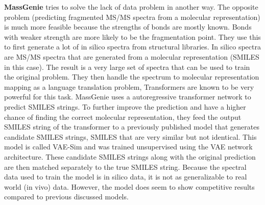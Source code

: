 \textbf{MassGenie} \cite{shrivastava2021massgenie} tries to solve the lack of data problem in another way. The opposite problem (predicting fragmented \ac{MS/MS} spectra from a molecular representation) is much more feasible because the strengths of bonds are mostly known. Bonds with weaker strength are more likely to be the fragmentation point. They use this to first generate a lot of in silico spectra from structural libraries. In silico spectra are \ac{MS/MS} spectra that are generated from a molecular representation (SMILES in this case). The result is a very large set of spectra that can be used to train the original problem. They then handle the spectrum to molecular representation mapping as a language translation problem, Transformers are known to be very powerful for this task. MassGenie uses a autoregressive transformer network to predict SMILES strings. 
To further improve the prediction and have a higher chance of finding the correct molecular representation, they feed the output SMILES string of the transformer to a previously published model that generates candidate SMILES strings, SMILES that are very similar but not identical. This model is called VAE-Sim \cite{samanta2020vae} and was trained unsupervised using the \ac{VAE} network architecture. These candidate SMILES strings along with the original prediction are then matched separately to the true SMILES string.
Because the spectral data used to train the model is in silico data, it is not as generalizable to real world (in vivo) data. However, the model does seem to show competitive results compared to previous discussed models.

